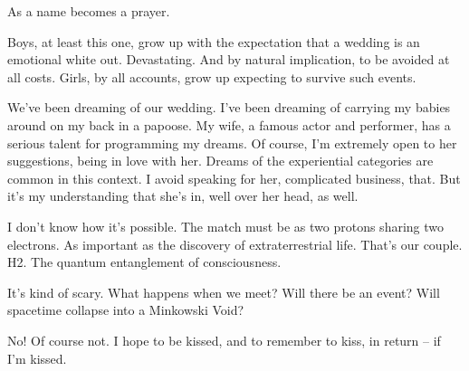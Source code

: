 As a name becomes a prayer.


\vfill
\break


﻿Boys, at least this one, grow up with the expectation that a wedding
is an emotional white out.  Devastating.  And by natural implication,
to be avoided at all costs.  Girls, by all accounts, grow up expecting
to survive such events.


We've been dreaming of our wedding.  I've been dreaming of carrying my
babies around on my back in a papoose.  My wife, a famous actor and
performer, has a serious talent for programming my dreams.  Of course,
I'm extremely open to her suggestions, being in love with her.  Dreams
of the experiential categories are common in this context.  I avoid
speaking for her, complicated business, that.  But it's my
understanding that she's in, well over her head, as well.


\vfill
\break


﻿I don't know how it's possible.  The match must be as two protons
sharing two electrons.  As important as the discovery of
extraterrestrial life.  That's our couple.  H2.  The quantum
entanglement of consciousness.


It's kind of scary.  What happens when we meet?  Will there be an
event?  Will spacetime collapse into a Minkowski Void?


No!  Of course not.  I hope to be kissed, and to remember to kiss, in
return -- if I'm kissed.


\vfill
\bye
